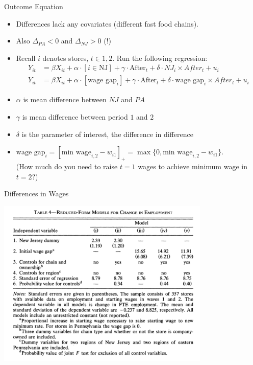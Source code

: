 \documentclass[xcolor=pdftex,dvipsnames,table,mathserif,aspectratio=169]{beamer}
\begin{document}
\begin{frame}{Outcome Equation}
\begin{itemize}
\item Differences lack any covariates (different fast food chains).
\item Also $\Delta_{PA}<0$ and $\Delta_{NJ} > 0$ (!)
\item Recall $i$ denotes stores, $t \in {1,2}$. Run the following regression:
\begin{align*}
Y_{it}&=\beta X_{it} +\alpha \cdot [i \in \text{NJ}] +  \gamma \cdot \text{After}_{t}  + \delta \cdot NJ_i \times After_{t} +u_{i}\\
Y_{it}&=\beta X_{it} +\alpha \cdot [\text{wage gap}_{i}] +  \gamma \cdot \text{After}_{t}  + \delta \cdot \text{wage gap}_{i} \times After_{t} +u_{i}
\end{align*}
\item $\alpha$ is mean difference between $NJ$ and $PA$
\item $\gamma$ is mean difference between period $1$ and $2$
\item $\delta$ is the parameter of interest, the \alert{difference in difference}
\item $\text{wage gap}_{i} = [\text{min wage}_{i,2}-w_{i1} ]_{+} =\max\{0, \text{min wage}_{i,2}-w_{i1}\} $.\\
 (How much do you need to raise $t=1$ wages to achieve minimum wage in $t=2$?)
\end{itemize}
\end{frame}

\begin{frame}{Differences in Wages}
\begin{center}
\includegraphics[width=4in]{./resources/ck_tab4.png}
\end{center}
\end{frame}
\end{document}
